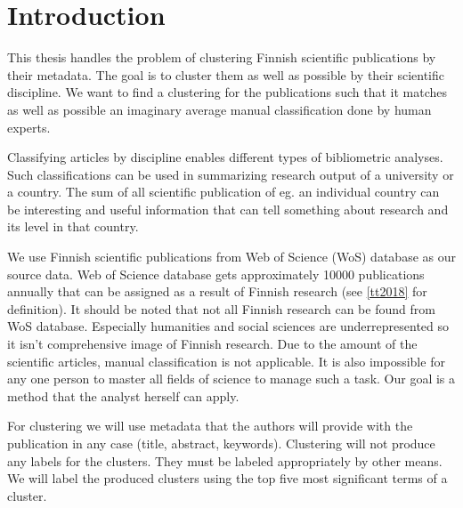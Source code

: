 \chapter{Introduction}
\label{chapter:intro}
This thesis handles the problem of clustering Finnish scientific 
publications by their metadata. The goal is to cluster 
them as well as possible by their scientific discipline. We want 
to find a clustering for the publications such that it matches 
as well as possible an imaginary average manual classification 
done by human experts.

Classifying articles by discipline enables different types of 
bibliometric analyses. Such classifications can be used in 
summarizing research output of a university or a country.
The sum of all scientific publication of eg. an individual country can be 
interesting and useful information that can tell something about 
research and its level in that country.

We use Finnish scientific publications from  Web of Science (WoS)
database as our source data. 
Web of Science database gets approximately 10000 publications 
annually that can be assigned as a result of Finnish research (see 
\ref{tt2018} for definition).
It should be noted that not all Finnish research can be found from
WoS database. Especially humanities and social sciences are 
underrepresented so it isn't comprehensive image of Finnish 
research.
Due to the amount of the scientific articles, manual 
classification is not applicable. It is also impossible for any 
one person to master all fields of science to manage such a
task. Our goal is a method that the analyst herself can apply.

For clustering we will use metadata that the authors will provide
with the publication in any case (title, abstract, keywords). 
Clustering will not produce any labels for the clusters. They must
be labeled appropriately by other means. We will label the 
produced clusters using the top five most significant terms of a 
cluster.

